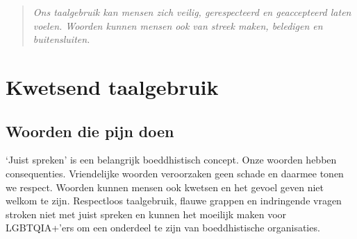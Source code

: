 \documentclass[12pt,openany]{book}
\begin{document}
\newpage
\thispagestyle{empty}
\begin{figure}[h]
    \centering
\end{figure}

\begin{quote}
\centering
\textit{\Large Ons taalgebruik kan mensen zich veilig, gerespecteerd en geaccepteerd laten voelen. Woorden kunnen mensen ook van streek maken, beledigen en buitensluiten.}
\end{quote}

\chapter*{Kwetsend taalgebruik}

\section*{Woorden die pijn doen}

‘Juist spreken’ is een belangrijk boeddhistisch concept. Onze woorden hebben consequenties. Vriendelijke woorden veroorzaken geen schade en daarmee tonen we respect. Woorden kunnen mensen ook kwetsen en het gevoel geven niet welkom te zijn. Respectloos taalgebruik, flauwe grappen en indringende vragen stroken niet met juist spreken en kunnen het moeilijk maken voor LGBTQIA+’ers om een onderdeel te zijn van boeddhistische organisaties.
\end{document}
